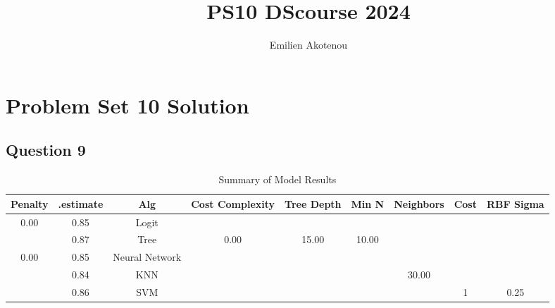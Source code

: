 \documentclass{article}
\title{PS10 DScourse 2024}
\author{Emilien Akotenou}
\begin{document}
\maketitle
\section*{Problem Set 10 Solution}

\subsection*{Question 9}

\begin{table}[htbp]
    \centering
    \caption{Summary of Model Results}
    \label{tab:model_results}
    \begin{tabular}{ccccccccc}
        \toprule
        Penalty & .estimate & Alg & Cost Complexity & Tree Depth & Min N & Neighbors & Cost & RBF Sigma \\
        \midrule
        \num{0.00} & \num{0.85} & Logit & & & & & & \\
        & \num{0.87} & Tree & \num{0.00} & \num{15.00} & \num{10.00} & & & \\
        \num{0.00} & \num{0.85} & Neural Network & & & & & & \\
        & \num{0.84} & KNN & & & & \num{30.00} & & \\
        & \num{0.86} & SVM & & & & & \num{1} & \num{0.25} \\
        \bottomrule
    \end{tabular}
\end{table}
\end{document}
